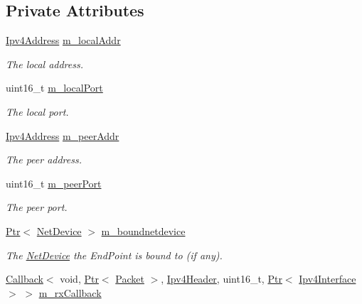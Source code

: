 \subsection*{Private Attributes}
\begin{DoxyCompactItemize}
\item 
\hyperlink{classns3_1_1Ipv4Address}{Ipv4\+Address} \hyperlink{classns3_1_1Ipv4EndPoint_ac31b3a095613982a9008b70efeaf5103}{m\+\_\+local\+Addr}
\begin{DoxyCompactList}\small\item\em The local address. \end{DoxyCompactList}\item 
uint16\+\_\+t \hyperlink{classns3_1_1Ipv4EndPoint_a55501f3aacd292d00041ec4c2e2134de}{m\+\_\+local\+Port}
\begin{DoxyCompactList}\small\item\em The local port. \end{DoxyCompactList}\item 
\hyperlink{classns3_1_1Ipv4Address}{Ipv4\+Address} \hyperlink{classns3_1_1Ipv4EndPoint_a8c44fb581a066c052302912a5ade04b2}{m\+\_\+peer\+Addr}
\begin{DoxyCompactList}\small\item\em The peer address. \end{DoxyCompactList}\item 
uint16\+\_\+t \hyperlink{classns3_1_1Ipv4EndPoint_a90c4b5fd81d6d3d7628eb36f1c42f16a}{m\+\_\+peer\+Port}
\begin{DoxyCompactList}\small\item\em The peer port. \end{DoxyCompactList}\item 
\hyperlink{classns3_1_1Ptr}{Ptr}$<$ \hyperlink{classns3_1_1NetDevice}{Net\+Device} $>$ \hyperlink{classns3_1_1Ipv4EndPoint_a933ecf471a5da3f4e69dfa649d536286}{m\+\_\+boundnetdevice}
\begin{DoxyCompactList}\small\item\em The \hyperlink{classns3_1_1NetDevice}{Net\+Device} the End\+Point is bound to (if any). \end{DoxyCompactList}\item 
\hyperlink{classns3_1_1Callback}{Callback}$<$ void, \hyperlink{classns3_1_1Ptr}{Ptr}$<$ \hyperlink{classns3_1_1Packet}{Packet} $>$, \hyperlink{classns3_1_1Ipv4Header}{Ipv4\+Header}, uint16\+\_\+t, \hyperlink{classns3_1_1Ptr}{Ptr}$<$ \hyperlink{classns3_1_1Ipv4Interface}{Ipv4\+Interface} $>$ $>$ \hyperlink{classns3_1_1Ipv4EndPoint_af4bc9cde477a79aa4cf17d886106c507}{m\+\_\+rx\+Callback}

\end{DoxyCompactItemize}

